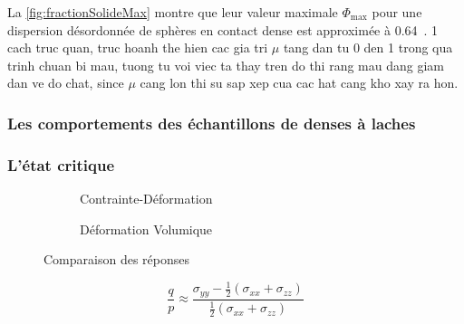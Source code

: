 \documentclass[a4paper,12pt]{report}
\begin{document}
La \autoref{fig:fractionSolideMax} montre que leur valeur maximale $\Phi_{\max}$ pour une dispersion désordonnée de sphères en contact dense est approximée à 0.64~\cite{combe2023demlecture}.
1 cach truc quan, truc hoanh the hien cac gia tri $\mu$ tang dan tu 0 den 1 trong qua trinh chuan bi mau, tuong tu voi viec ta thay tren do thi rang mau dang giam dan ve do chat, since $\mu$ cang lon thi su sap xep cua cac hat cang kho xay ra hon.


\subsubsection{Les comportements des échantillons de denses à laches}
\subsubsection{L'état critique}
\begin{figure}[htbp]
    \centering
    \begin{subfigure}[b]{0.49\textwidth}
        \centering \small
        \scalebox{0.5}{}
        \caption{Contrainte-Déformation}
        \label{fig:contrainte}
    \end{subfigure}
    \hfill
    \begin{subfigure}[b]{0.49\textwidth}
        \centering \small
        \scalebox{0.5}{}
        \caption{Déformation Volumique}
        \label{fig:defvo}
    \end{subfigure}
    \caption{Comparaison des réponses}
    \label{fig:comparaison}
\end{figure}

\begin{equation}
    \frac{q}{p} \approx \frac{\sigma_{yy} - \frac{1}{2} (\sigma_{xx} + \sigma_{zz})}{\frac{1}{2} (\sigma_{xx} + \sigma_{zz})}
    \label{eq:qformulation}
\end{equation}
\end{document}
